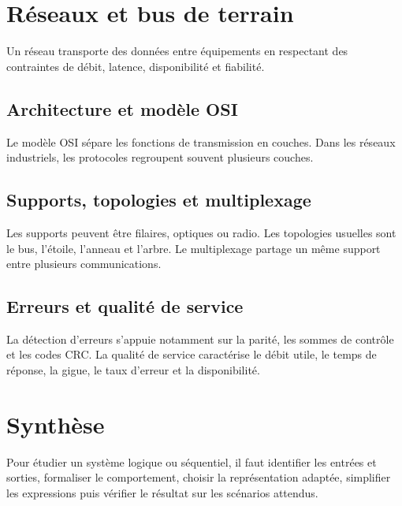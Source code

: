 \section{Réseaux et bus de terrain}
Un réseau transporte des données entre équipements en respectant des contraintes de débit, latence, disponibilité et fiabilité.

\subsection{Architecture et modèle OSI}
\begin{center}\TLModeleOSI\end{center}
Le modèle OSI sépare les fonctions de transmission en couches. Dans les réseaux industriels, les protocoles regroupent souvent plusieurs couches.

\subsection{Supports, topologies et multiplexage}
Les supports peuvent être filaires, optiques ou radio. Les topologies usuelles sont le bus, l'étoile, l'anneau et l'arbre. Le multiplexage partage un même support entre plusieurs communications.

\subsection{Erreurs et qualité de service}
La détection d'erreurs s'appuie notamment sur la parité, les sommes de contrôle et les codes CRC. La qualité de service caractérise le débit utile, le temps de réponse, la gigue, le taux d'erreur et la disponibilité.

\section{Synthèse}
Pour étudier un système logique ou séquentiel, il faut identifier les entrées et sorties, formaliser le comportement, choisir la représentation adaptée, simplifier les expressions puis vérifier le résultat sur les scénarios attendus.

